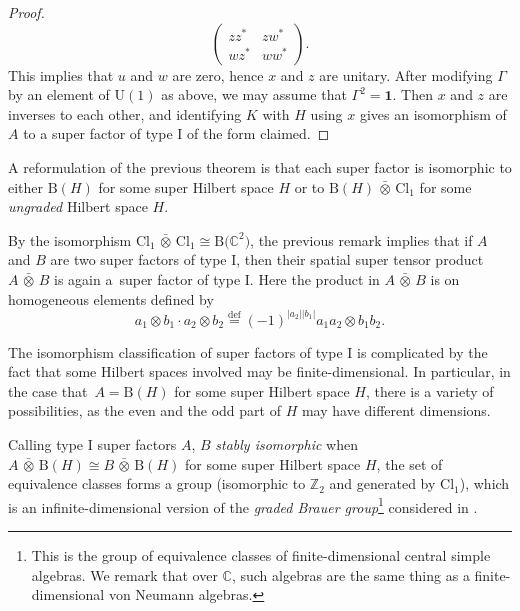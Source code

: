 \documentclass[10pt,a4paper]{amsart}
\numberwithin{equation}{section}
\newcommand{\Z}{\mathbb{Z}}
\newcommand{\C}{\mathbb{C}}
\newcommand{\B}{\mathrm{B}}
\newcommand{\Cl}{\mathrm{Cl}}
\newcommand{\U}{\mathrm{U}}
\newcommand{\defeq}{\stackrel{\mathrm{def}}{=}}
\begin{document}
\begin{proof}
\begin{equation*}
 \begin{pmatrix} zz^* & z w^* \\ wz^* & ww^* \end{pmatrix}.
 \end{equation*}
 This implies that $u$ and $w$ are zero, hence $x$ and $z$ are unitary.
 After modifying $\Gamma$ by an element of $\U(1)$ as above, we may assume that $\Gamma^2 = \mathbf{1}$.
 Then $x$ and $z$ are inverses to each other, and identifying $K$ with $H$ using $x$ gives an isomorphism of $A$ to a super factor of type I of the form claimed.
\end{proof}

\begin{Remark}
A reformulation of the previous theorem is that each super factor is isomorphic to either $\B(H)$ for some super Hilbert space $H$ or to $\B(H) \,\bar{\otimes}\, \Cl_1$ for some \emph{ungraded} Hilbert space $H$.
\end{Remark}

\begin{Remark} \label{RemarkTensorProductFactor}
By the isomorphism $\Cl_1 \,\bar{\otimes}\, \Cl_1 \cong \B\big(\C^2\big)$, the previous remark implies that if $A$ and $B$ are two super factors of type I, then their spatial super tensor product $A \,\bar{\otimes}\, B$ is again a~super factor of type I. Here the product in $A \,\bar{\otimes}\, B$ is on homogeneous elements defined by
\begin{equation*}
a_1 \otimes b_1 \cdot a_2 \otimes b_2 \defeq (-1)^{|a_2||b_1|} a_1 a_2 \otimes b_1 b_2.
\end{equation*}
\end{Remark}

\begin{Remark}
The isomorphism classification of super factors of type I is complicated by the fact that some Hilbert spaces involved may be finite-dimensional.
In particular, in the case that~$A = \B(H)$ for some super Hilbert space $H$, there is a variety of possibilities, as the even and the odd part of $H$ may have different dimensions.

Calling type I super factors $A$, $B$ \emph{stably isomorphic} when $A \,\bar{\otimes}\, \B(H) \cong B \,\bar{\otimes}\, \B(H)$ for some super Hilbert space $H$, the set of equivalence classes forms a group (isomorphic to $\Z_2$ and generated by $\Cl_1$), which is an infinite-dimensional version of the \emph{graded Brauer group}\footnote{This is the group of equivalence classes of finite-dimensional central simple algebras.
We remark that over $\C$, such algebras are the same thing as a finite-dimensional von Neumann algebras.} considered in \cite{WallGradedBrauer}.
\end{Remark}
\end{document}

